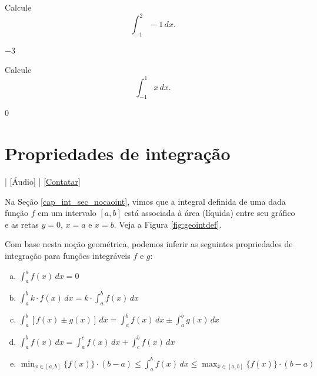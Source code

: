 \begin{exer}
  Calcule
  \begin{equation}
    \int_{-1}^2 -1\,dx.
  \end{equation}
\end{exer}
\begin{resp}
  $-3$
\end{resp}

\begin{exer}
  Calcule
  \begin{equation}
    \int_{-1}^{1} x\,dx.
  \end{equation}
\end{exer}
\begin{resp}
  $0$
\end{resp}

\section{Propriedades de integração}\label{cap_int_sec_propint}

\begin{flushright}
  [Vídeo] | [Áudio] | \href{https://phkonzen.github.io/notas/contato.html}{[Contatar]}
\end{flushright}

Na Seção \ref{cap_int_sec_nocaoint}, vimos que a integral definida de uma dada função $f$ em um intervalo $[a, b]$ está associada à área (líquida) entre seu gráfico e as retas $y=0$, $x=a$ e $x=b$. Veja a Figura \ref{fig:geointdef}.

Com base nesta noção geométrica, podemos inferir as seguintes propriedades de integração para funções integráveis $f$ e $g$:
\begin{enumerate}[a)]
\item $\displaystyle \int_a^a f(x)\,dx = 0$
\item $\displaystyle \int_a^b k\cdot f(x)\,dx = k\cdot\int_a^b f(x)\,dx$
\item $\displaystyle \int_a^b \left[f(x)\pm g(x)\right]\,dx = \int_a^b f(x)\,dx \pm \int_a^b g(x)\,dx$
\item $\displaystyle \int_a^b f(x)\,dx = \int_a^c f(x)\,dx + \int_c^b f(x)\,dx$
\item $\displaystyle \min_{x\in [a, b]} \{f(x)\}\cdot (b-a) \leq \int_a^b f(x)\,dx \leq \max_{x\in [a, b]} \{f(x)\}\cdot (b-a)$
\end{enumerate}

